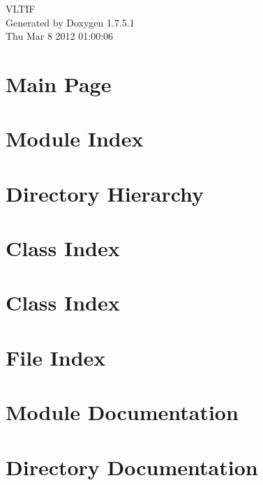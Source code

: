 \documentclass[a4paper]{book}
\begin{document}
\hypersetup{pageanchor=false,citecolor=blue}
\begin{titlepage}
\vspace*{7cm}
\begin{center}
{\Large \-V\-L\-T\-I\-F }\\
\vspace*{1cm}
{\large \-Generated by Doxygen 1.7.5.1}\\
\vspace*{0.5cm}
{\small Thu Mar 8 2012 01:00:06}\\
\end{center}
\end{titlepage}
\clearemptydoublepage
{}
\tableofcontents
\clearemptydoublepage
{}
\hypersetup{pageanchor=true,citecolor=blue}
\chapter{\-Main \-Page}
\label{index}\hypertarget{index}{}
\chapter{\-Module \-Index}

\chapter{\-Directory \-Hierarchy}

\chapter{\-Class \-Index}

\chapter{\-Class \-Index}

\chapter{\-File \-Index}

\chapter{\-Module \-Documentation}




\chapter{\-Directory \-Documentation}





\end{document}
